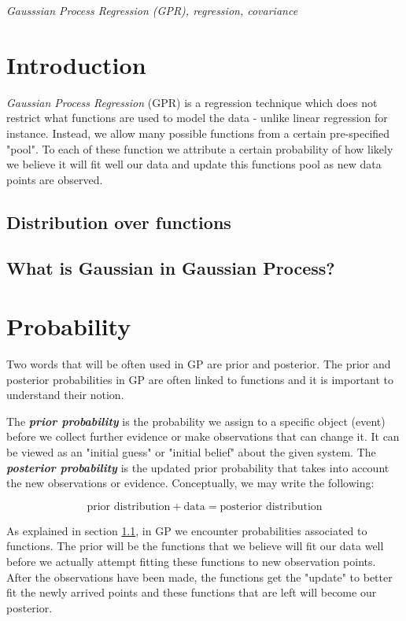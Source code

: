 \documentclass[10pt,twocolumn]{article}
\begin{document}
\textit{Gausssian Process Regression (GPR), regression, covariance}

\tableofcontents

\section{Introduction}

\textit{Gaussian Process Regression} (GPR) is a regression technique which does not restrict what functions are used to model the data - unlike linear regression for instance. Instead, we allow many possible functions from a certain pre-specified "pool". To each of these function we attribute a certain  probability of how likely we believe it will fit well our data and update this functions pool as new data points are observed.


\subsection{Distribution over functions} \label{sec:dist_over_fun}


\subsection{What is Gaussian in Gaussian Process?}



\section{Probability}

Two words that will be often used in GP are prior and posterior. The prior and posterior probabilities in GP are often linked to functions and it is important to understand their notion. 

The \textbf{\textit{prior probability}} is the probability we assign to a specific object (event) before we collect further evidence or make observations that can change it. It can be viewed as an "initial guess" or "initial belief" about the given system. The \textbf{\textit{posterior probability}} is the updated prior probability that takes into account the new observations or evidence. Conceptually, we may write the following:

\begin{equation}
\text{prior distribution} + \text{data} = \text{posterior distribution}
\end{equation}

As explained in section \ref{sec:dist_over_fun}, in GP we encounter probabilities associated to functions. The prior will be the functions that we believe will fit our data well before we actually attempt fitting these functions to new observation points. After the observations have been made, the functions get the "update" to better fit the newly arrived points and these functions that are left will become our posterior.
\end{document}
